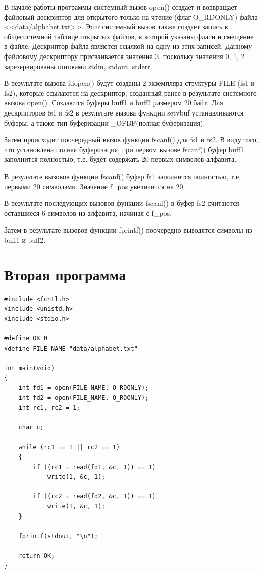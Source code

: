 \documentclass[12pt,a4paper]{scrreprt}
\begin{document}
В начале работы программы системный вызов open() создает и возвращает файловый дескриптор для открытого только на чтение (флаг O\_RDONLY) файла <<data/alphabet.txt>>. Этот системный вызов также создает запись в общесистемной таблице открытых файлов, в которой указаны флаги и смещение в файле. Дескриптор файла является ссылкой на одну из этих записей. Данному файловому дескриптору присваивается значение 3, поскольку значения 0, 1, 2 зарезервированы потоками stdin, stdout, stderr.

В результате вызова fdopen() будут созданы 2 экземпляра структуры FILE (fs1 и fs2), которые ссылаются на дескриптор, созданный ранее в результате системного вызова open(). Создаются буферы buff1 и buff2 размером 20 байт. Для дескрипторов fs1 и fs2 в результате вызова функции setvbuf устанавливаются буферы, а также тип буферизации \_OFBF(полная буферизация).

Затем происходит поочередный вызов функции fscanf() для fs1 и fs2. В виду того, что установлена полная буферизация, при первом вызове fscanf() буфер buff1 заполнится полностью, т.е. будет содержать 20 первых символов алфавита.

В результате вызовов функции fscanf() буфер fs1 заполнится полностью, т.е. первыми 20 символами. Значение f\_pos увеличится на 20.

В результате последующих вызовов функции fscanf() в буфер fs2 считаются оставшиеся 6 символов из алфавита, начиная с f\_pos. 

Затем в результате вызовов функции fprintf() поочередно выводятся символы из buff1 и buff2.

\section{Вторая программа}

\begin{lstlisting}[caption=Программа №2 (один поток)]
#include <fcntl.h>
#include <unistd.h>
#include <stdio.h>

#define OK 0
#define FILE_NAME "data/alphabet.txt"

int main(void)
{
	int fd1 = open(FILE_NAME, O_RDONLY);
	int fd2 = open(FILE_NAME, O_RDONLY);
	int rc1, rc2 = 1;
	
	char c;
	
	while (rc1 == 1 || rc2 == 1)
	{
		if ((rc1 = read(fd1, &c, 1)) == 1)
			write(1, &c, 1);
		
		if ((rc2 = read(fd2, &c, 1)) == 1)
			write(1, &c, 1);
	}
	
	fprintf(stdout, "\n");
	
	return OK;
}
\end{lstlisting}
\end{document}
